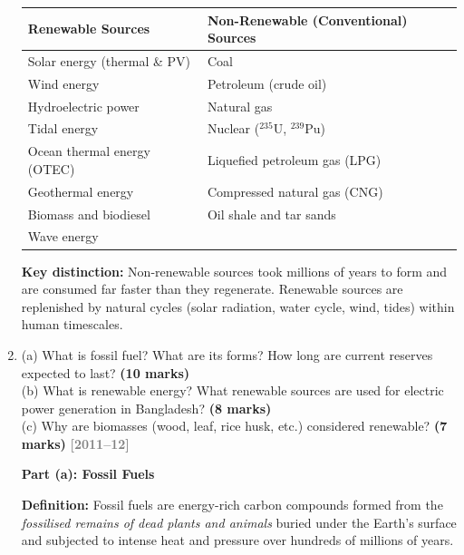 \documentclass[12pt,a3paper]{article}
\newcommand{\yr}[1]{\hfill\textcolor{gray}{\small\textbf{[#1]}}}
\newcommand{\mk}[1]{\textcolor{orange!70!black}{\small\textbf{(#1 marks)}}}
\begin{document}
\begin{enumerate}
\begin{tcolorbox}[enhanced,breakable,ansbox,colback=cA!4,colframe=cA,
  boxrule=0.8pt,arc=5pt,
  title={\textbf{Answer}},fonttitle=\bfseries\color{white},colbacktitle=cA]
\begin{center}
\small
\begin{tabular}{@{}p{7cm}p{7cm}@{}}
\toprule
\textbf{Renewable Sources} & \textbf{Non-Renewable (Conventional) Sources} \\
\midrule
Solar energy (thermal \& PV)   & Coal \\
Wind energy                    & Petroleum (crude oil) \\
Hydroelectric power            & Natural gas \\
Tidal energy                   & Nuclear (${}^{235}$U, ${}^{239}$Pu) \\
Ocean thermal energy (OTEC)    & Liquefied petroleum gas (LPG) \\
Geothermal energy              & Compressed natural gas (CNG) \\
Biomass and biodiesel          & Oil shale and tar sands \\
Wave energy                    & \\
\bottomrule
\end{tabular}
\end{center}

\textbf{Key distinction:} Non-renewable sources took millions of years to form and are consumed far faster than they regenerate. Renewable sources are replenished by natural cycles (solar radiation, water cycle, wind, tides) within human timescales.

\end{tcolorbox}

\item \label{qlabel:A1-Q9}
(a) What is fossil fuel? What are its forms? How long are current reserves expected to last? \mk{10}\\
(b) What is renewable energy? What renewable sources are used for electric power generation in Bangladesh? \mk{8}\\
(c) Why are biomasses (wood, leaf, rice husk, etc.) considered renewable? \mk{7}
\yr{2011--12}

\begin{tcolorbox}[enhanced,breakable,ansbox,colback=cA!4,colframe=cA,
  boxrule=0.8pt,arc=5pt,
  title={\textbf{Answer}},fonttitle=\bfseries\color{white},colbacktitle=cA]

\textbf{Part (a): Fossil Fuels}

\textbf{Definition:} Fossil fuels are energy-rich carbon compounds formed from the \emph{fossilised remains of dead plants and animals} buried under the Earth's surface and subjected to intense heat and pressure over hundreds of millions of years.


\end{tcolorbox}
\end{enumerate}
\end{document}
